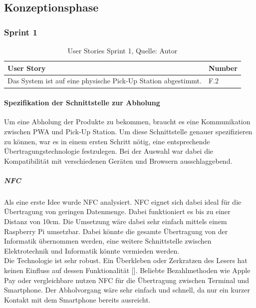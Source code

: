 \subsection{Konzeptionsphase}
\subsubsection{Sprint 1}\label{Sprint1}
\begin{table}[H]
	\begin{tabularx}{\textwidth}{|l|X|}
		\hline
		User Story & Number \\
		\hline
		Das System ist auf eine physische Pick-Up Station abgestimmt. & F.2\\
		\hline
	\end{tabularx} 
\caption[User Stories Sprint 1]{User Stories Sprint 1, Quelle: Autor}
\end{table}\label{userStoriesSprint1}

\paragraph{Spezifikation der Schnittstelle zur Abholung}\label{SpezifikationSchnittstelleAbholung}
Um eine Abholung der Produkte zu bekommen, braucht es eine Kommunikation zwischen  \gls{PWA} und Pick-Up Station. Um diese Schnittstelle genauer spezifizieren zu können, war es in einem ersten Schritt nötig, eine entsprechende Übertragungstechnologie festzulegen. Bei der Auswahl war dabei die Kompatibilität mit verschiedenen Geräten und Browsern ausschlaggebend. 
\subparagraph{NFC}
Als eine erste Idee wurde \ac{NFC} analysiert. \ac{NFC} eignet sich dabei ideal für die Übertragung von geringen Datenmenge. Dabei funktioniert es bis zu einer Distanz von 10cm. Die Umsetzung wäre dabei sehr einfach mittels einem Raspberry Pi umsetzbar. Dabei könnte die gesamte Übertragung von der Informatik übernommen werden, eine weitere Schnittstelle zwischen Elektrotechnik und Informatik könnte vermieden werden.  \\Die Technologie ist sehr robust. Ein Überkleben oder Zerkratzen des Lesers hat keinen Einfluss auf dessen Funktionalität  [\cite{nfc}]. Beliebte Bezahlmethoden wie Apple Pay oder vergleichbare nutzen \ac{NFC} für die Übertragung zwischen Terminal und Smartphone. 
Der Abholvorgang wäre sehr einfach und schnell, da nur ein kurzer Kontakt mit dem Smartphone bereits ausreicht. \\\\

